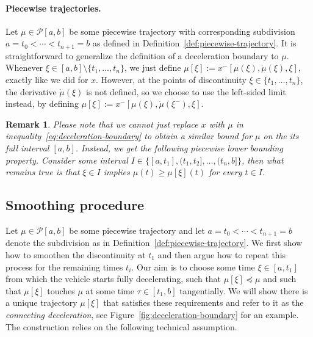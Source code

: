 \documentclass[a4paper]{report}
\theoremstyle{definition}
\theoremstyle{plain}
\newtheorem{remarknum}{Remark}[chapter]
\newcommand\openhalf[2]{\ensuremath{(#1,#2]}}
\begin{document}
\paragraph{Piecewise trajectories.}
Let $\mu \in \mathcal{P}[a, b]$ be some piecewise trajectory with corresponding
subdivision $a = t_{0} < \cdots < t_{n+1} = b$ as defined in Definition~\ref{def:piecewise-trajectory}. It is
straightforward to generalize the definition of a deceleration boundary to $\mu$.
%
Whenever $\xi \in [a,b] \setminus \{ t_{1}, \dots, t_{n}\}$, we just define
$\mu[\xi] := x^{-}[\mu(\xi), \dot{\mu}(\xi), \xi]$, exactly like we did for $x$.
%
However, at the points of discontinuity $\xi \in \{ t_{1}, \dots, t_{n}\}$, the
derivative $\dot{\mu}(\xi)$ is not defined, so we choose to use the left-sided limit
instead, by defining $\mu[\xi] := x^{-}[\mu(\xi), \dot{\mu}(\xi^{-}), \xi]$.

\begin{remarknum}\label{rem:lower-bound-piecewise}
  Please note that we cannot just replace $x$ with $\mu$ in inequality~\eqref{eq:deceleration-boundary} to
  obtain a similar bound for $\mu$ on the its full interval $[a,b]$.
  Instead, we get the following \emph{piecewise lower bounding} property.
  Consider some interval
  $I \in \{ [a, t_{1}], \openhalf{t_{1}}{t_{2}}, \dots, \openhalf{t_{n}}{b} \}$, then what
  remains true is that $\xi \in I$ implies $\mu(t) \geq \mu[\xi](t)$ for every $t \in I$.
\end{remarknum}


\subsection{Smoothing procedure}\label{sec:smoothing}
Let $\mu \in \mathcal{P}[a,b]$ be some piecewise trajectory and let
$a = t_{0} < \cdots < t_{n+1} = b$ denote the subdivision as in Definition~\ref{def:piecewise-trajectory}.
%
We first show how to smoothen the discontinuity at $t_{1}$ and then argue how to
repeat this process for the remaining times $t_{i}$.
Our aim is to choose some time $\xi \in [a,t_{1}]$ from which the vehicle starts
fully decelerating, such that $\mu[\xi] \preceq \mu$ and such that $\mu[\xi]$ touches $\mu$ at some time
$\tau \in [t_{1}, b]$ tangentially.
%
We will show there is a unique trajectory $\mu[\xi]$ that satisfies these requirements
and refer to it as the \emph{connecting deceleration}, see
Figure~\ref{fig:deceleration-boundary} for an example.
%
The construction relies on the following technical assumption.
\end{document}
